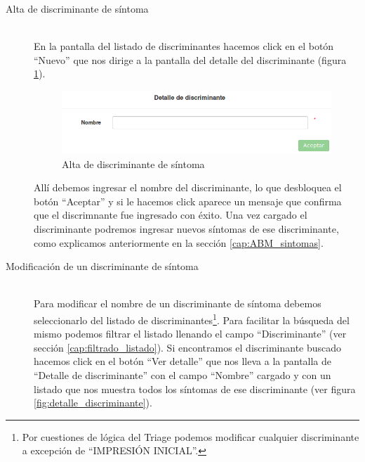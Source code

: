 \begin{description}
\item[Alta de discriminante de síntoma] \mbox{} \\
En la pantalla del listado de discriminantes hacemos click en el botón ``Nuevo'' que nos dirige a la pantalla del detalle del discriminante (figura \ref{fig:nuevo_discriminante}).
\begin{figure}
\centerline{\includegraphics[width=1\textwidth]{nuevo_discriminante.png}}
\caption{Alta de discriminante de síntoma}
\label{fig:nuevo_discriminante}
\end{figure}
Allí debemos ingresar el nombre del discriminante, lo que desbloquea el botón ``Aceptar'' y si le hacemos click aparece un mensaje que confirma que el discrimnante fue ingresado con éxito. Una vez cargado el discriminante podremos ingresar nuevos síntomas de ese discriminante, como explicamos anteriormente en la sección \ref{cap:ABM_sintomas}.
\item[Modificación de un discriminante de síntoma] \mbox{} \\
Para modificar el nombre de un discriminante de síntoma debemos seleccionarlo del listado de discriminantes\footnote{Por cuestiones de lógica del Triage podemos modificar cualquier discriminante a excepción de ``IMPRESIÓN INICIAL''.}. Para facilitar la búsqueda del mismo podemos filtrar el listado llenando el campo ``Discriminante'' (ver sección \ref{cap:filtrado_listado}). Si encontramos el discriminante buscado hacemos click en el botón ``Ver detalle'' que nos lleva a la pantalla de ``Detalle de discriminante'' con el campo ``Nombre'' cargado y con un listado que nos muestra todos los síntomas de ese discriminante (ver figura \ref{fig:detalle_discriminante}).
\begin{figure}

\end{figure}
\end{description}
